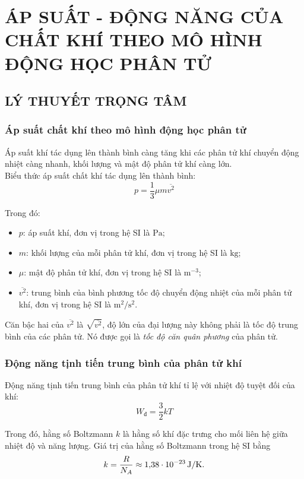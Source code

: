 \section{ÁP SUẤT - ĐỘNG NĂNG CỦA CHẤT KHÍ THEO MÔ HÌNH ĐỘNG HỌC PHÂN TỬ}
\subsection{LÝ THUYẾT TRỌNG TÂM}
\subsubsection{Áp suất chất khí theo mô hình động học phân tử}
\begin{boxdl}
	Áp suất khí tác dụng lên thành bình càng tăng khi các phân tử khí chuyển động nhiệt càng nhanh, khối lượng và mật độ phân tử khí càng lớn.\\
	Biểu thức áp suất chất khí tác dụng lên thành bình:
	\begin{equation}
		p=\dfrac{1}{3}\mu m\overline{v^2}
	\end{equation}
\end{boxdl}
Trong đó:
\begin{itemize}
	\item $p$: áp suất khí, đơn vị trong hệ SI là $\si{\pascal}$;
	\item $m$: khối lượng của mỗi phân tử khí, đơn vị trong hệ SI là $\si{\kilogram}$;
	\item $\mu$: mật độ phân tử khí, đơn vị trong hệ SI là $\si{\meter^{-3}}$;
	\item $\overline{v^2}$: trung bình của bình phương tốc độ chuyển động nhiệt của mỗi phân tử khí, đơn vị trong hệ SI là $\si{\meter^2/\second^2}$.
\end{itemize}
\begin{luuy}
	Căn bậc hai của $\overline{v^2}$ là $\sqrt{\overline{v^2}}$, độ lớn của đại lượng này không phải là tốc độ trung bình của các phân tử. Nó được gọi là \textit{tốc độ căn quân phương} của phân tử.
\end{luuy}
\subsubsection{Động năng tịnh tiến trung bình của phân tử khí}
\begin{boxdl}
	Động năng tịnh tiến trung bình của phân tử khí tỉ lệ với nhiệt độ tuyệt đối của khí:
	\begin{equation}
		W_\text{đ}=\dfrac{3}{2}kT
	\end{equation}
	
\end{boxdl}
\begin{boxdn}
	Trong đó, hằng số Boltzmann $k$ là hằng số khí đặc trưng cho mối liên hệ giữa nhiệt độ và năng lượng. Giá trị của hằng số Boltzmann trong hệ SI bằng
	$$k=\dfrac{R}{N_A}\approx\SI{1.38E-23}{\joule/\kelvin}.$$
\end{boxdn}

